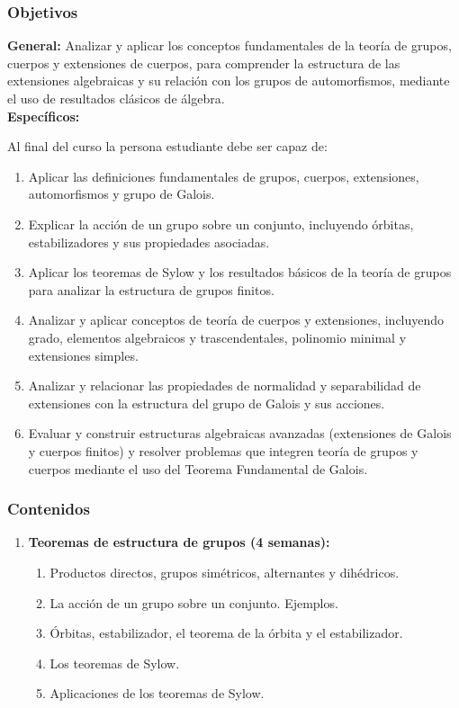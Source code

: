 \begin{refsection}
\subsubsection*{Objetivos}

\textbf{General:} Analizar y aplicar los conceptos fundamentales de la teoría de grupos, cuerpos y extensiones de cuerpos, para comprender la estructura de las extensiones algebraicas y su relación con los grupos de automorfismos, mediante el uso de resultados clásicos de álgebra. \\

\textbf{Específicos:}

Al final del curso la persona estudiante debe ser capaz de:

\begin{enumerate}
\item Aplicar las definiciones fundamentales de grupos, cuerpos, extensiones, automorfismos y grupo de Galois.

\item Explicar la acción de un grupo sobre un conjunto, incluyendo órbitas, estabilizadores y sus propiedades asociadas.

\item Aplicar los teoremas de Sylow y los resultados básicos de la teoría de grupos para analizar la estructura de grupos finitos.

\item Analizar y aplicar conceptos de teoría de cuerpos y extensiones, incluyendo grado, elementos algebraicos y trascendentales, polinomio minimal y extensiones simples.

\item Analizar y relacionar las propiedades de normalidad y separabilidad de extensiones con la estructura del grupo de Galois y sus acciones.

\item Evaluar y construir estructuras algebraicas avanzadas (extensiones de Galois y cuerpos finitos) y resolver problemas que integren teoría de grupos y cuerpos mediante el uso del Teorema Fundamental de Galois.
\end{enumerate}

\subsubsection*{Contenidos}

\begin{enumerate}
    
\item \textbf{Teoremas de estructura de grupos (4 semanas):} 
\begin{enumerate}
\item Productos directos, grupos simétricos, alternantes y dihédricos.
    \item La acción de un grupo sobre un conjunto. Ejemplos.
    \item Órbitas, estabilizador, el teorema de la órbita y el estabilizador.
    \item Los teoremas de Sylow.
    \item Aplicaciones de los teoremas de Sylow.
\end{enumerate}


\end{enumerate}
\end{refsection}
